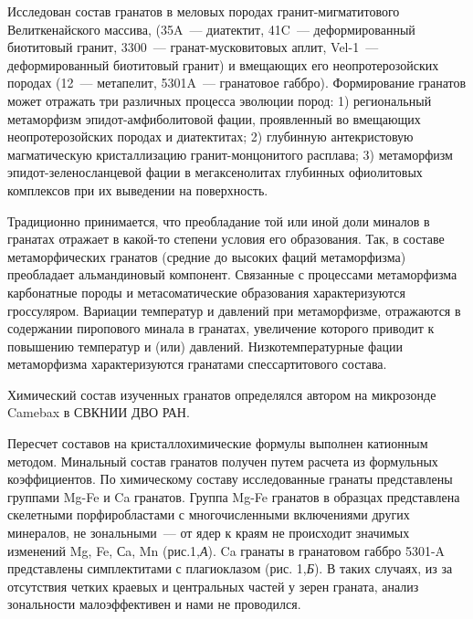  

\makeProcTitle
{}

Исследован состав гранатов в меловых породах гранит-мигматитового Велиткенайского массива, (35A~--- диатектит, 41C~--- деформированный биотитовый гранит, 3300~--- гранат-мусковитовых аплит, Vel-1~--- деформированный биотитовый гранит) и вмещающих его неопротерозойских породах (12~--- метапелит, 5301A~--- гранатовое габбро).  Формирование гранатов может отражать три различных процесса эволюции пород: 1) региональный метаморфизм эпидот-амфиболитовой фации, проявленный во вмещающих неопротерозойских породах и диатектитах; 2) глубинную антекристовую магматическую кристаллизацию гранит-монцонитого расплава; 3) метаморфизм эпидот-зеленосланцевой фации в мегаксенолитах глубинных офиолитовых комплексов при их выведении на поверхность.

Традиционно принимается, что преобладание той или иной доли миналов в гранатах отражает в какой-то степени  условия его образования.  Так, в составе метаморфических гранатов  (средние до высоких фаций метаморфизма) преобладает альмандиновый компонент. Связанные с процессами метаморфизма карбонатные породы и метасоматические образования характеризуются гроссуляром. Вариации температур и давлений при метаморфизме, отражаются  в содержании пиропового минала в гранатах, увеличение которого приводит к повышению температур и (или) давлений. Низкотемпературные фации метаморфизма характеризуются гранатами спессартитового состава.

Химический состав изученных гранатов определялся автором на микрозонде Camebax в СВКНИИ ДВО РАН.

Пересчет составов на кристаллохимические формулы выполнен катионным методом. Минальный состав гранатов получен путем расчета из формульных коэффициентов. По химическому составу исследованные гранаты представлены группами Mg-Fe и Ca гранатов. Группа Mg-Fe гранатов в образцах представлена  скелетными порфиробластами с многочисленными включениями других минералов, не  зональными~--- от ядер к краям не происходит значимых изменений Mg, Fe, Сa, Mn (рис.1,\textit{А}). Ca гранаты в гранатовом габбро 5301-A представлены симплектитами с плагиоклазом (рис. 1,\textit{Б}).  В таких случаях, из за отсутствия четких  краевых и  центральных частей у зерен граната, анализ зональности малоэффективен и нами не проводился.

